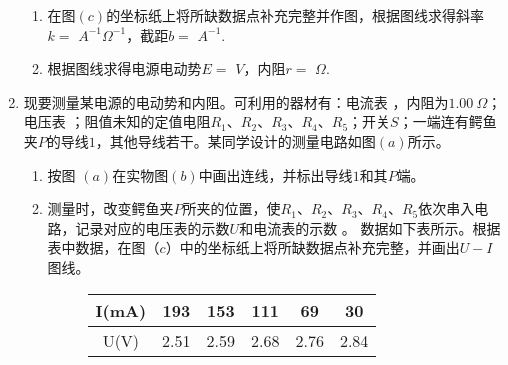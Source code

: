 \begin{enumerate}[leftmargin=0em]
\begin{enumerate}
\item 
在图$ (c) $的坐标纸上将所缺数据点补充完整并作图，根据图线求得斜率$ k= $  
$A^{-1} \Omega^{ -1} $，截距$ b= $  
$A^{-1} $.


\item 
根据图线求得电源电动势$ E=$  
$V $，内阻$ r= $  
$\Omega $. 

\end{enumerate}



\newpage
\item 
{}
现要测量某电源的电动势和内阻。可利用的器材有：电流表 \ammetermytikz ，内阻为$ 1.00 \ \Omega $；电压表 \voltmetermytikz ；阻值未知的定值电阻$ R_{1} $、$ R_{2} $、$ R_{3} $、$ R_{4} $、$ R_{5} $；开关$ S $；一端连有鳄鱼夹$ P $的导线$ 1 $，其他导线若干。某同学设计的测量电路如图$ (a) $所示。
\begin{figure}[h!]
\centering

\end{figure}



\begin{enumerate}
\renewcommand{\labelenumi}{\arabic{enumi}.}
\item
按图 $ (a) $在实物图$ (b) $中画出连线，并标出导线$ 1 $和其$ P $端。
\item 
测量时，改变鳄鱼夹$ P $所夹的位置，使$ R_{1} $、$ R_{2} $、$ R_{3} $、$ R_{4} $、$ R_{5} $依次串入电路，记录对应的电压表的示数$ U $和电流表的示数  。 数据如下表所示。根据表中数据，在图（$ c $）中的坐标纸上将所缺数据点补充完整，并画出$ U-I $图线。

\begin{figure}[h!]
\centering 
\begin{tabular}{|c|c|c|c|c|c|}
\hline 
I(mA) & 193 & 153 & 111 & 69 & 30
 \\
\hline
U(V) & 2.51 & 2.59 & 2.68 & 2.76 & 2.84\\ 
\hline 
\end{tabular} \qquad 
 
\end{figure}



\end{enumerate}
\end{enumerate}
